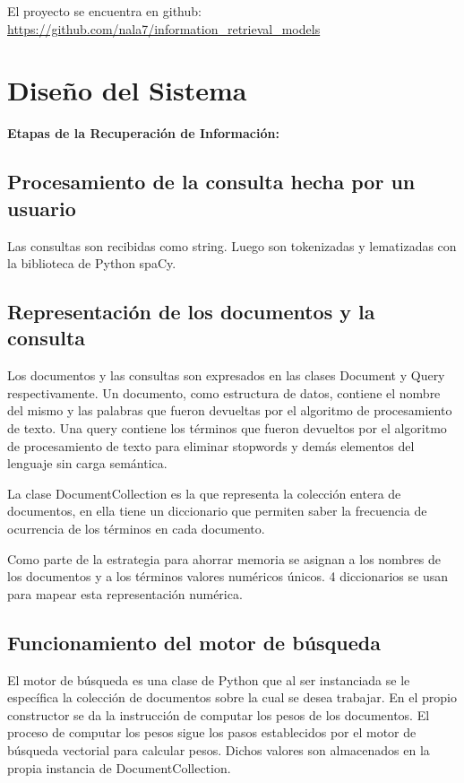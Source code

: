 \documentclass[runningheads,a4paper]{llncs}
\begin{document}
El proyecto se encuentra en github: \url{https://github.com/nala7/information_retrieval_models}

\section{Diseño del Sistema}\label{sec:diseño-del-sistema}
\textbf{Etapas de la Recuperación de Información:}

\subsection{Procesamiento de la consulta hecha por un usuario}\label{subsec:procesamiento-de-la-consulta-hecha-por-un-usuario}
Las consultas son recibidas como string.
Luego son tokenizadas y lematizadas con la biblioteca de Python spaCy.

\subsection{Representación de los documentos y la consulta}\label{subsec:representación-de-los-documentos-y-la-consulta}
Los documentos y las consultas son expresados en las clases Document y Query respectivamente.
Un documento, como estructura de datos, contiene el nombre del mismo y las palabras que fueron devueltas por el algoritmo de procesamiento de texto.
Una query contiene los términos que fueron devueltos por el algoritmo de procesamiento de texto para eliminar stopwords y demás elementos del lenguaje sin carga semántica.

La clase DocumentCollection es la que representa la colección entera de documentos, en ella tiene un diccionario que permiten saber la frecuencia de ocurrencia de los términos en cada documento.

Como parte de la estrategia para ahorrar memoria se asignan a los nombres de los documentos y a los términos valores numéricos únicos.
4 diccionarios se usan para mapear esta representación numérica.
\subsection{Funcionamiento del motor de búsqueda}\label{subsec:funcionamiento-del-motor-de-búsqueda}
El motor de búsqueda es una clase de Python que al ser instanciada se le específica la colección de documentos sobre la cual se desea trabajar.
En el propio constructor se da la instrucción de computar los pesos de los documentos.
El proceso de computar los pesos sigue los pasos establecidos por el motor de búsqueda vectorial para calcular pesos.
Dichos valores son almacenados en la propia instancia de DocumentCollection.
\end{document}

